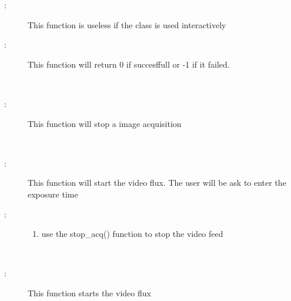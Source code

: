 \documentclass[letterpaper,10pt,english]{sphinxmanual}
\begin{document}
\begin{fulllineitems}
\begin{fulllineitems}
\begin{description}
\item[{:}] \leavevmode
This function is useless if the class is used interactively

\item[{:}] \leavevmode
This function will return 0 if succesffull or -1 if it failed.

\end{description}

\end{fulllineitems}


\begin{fulllineitems}
\label{\detokenize{index:python_andor.command.stop_acq}}~\begin{description}
\item[{:}] \leavevmode
This function will stop a image acquisition

\end{description}

\end{fulllineitems}


\begin{fulllineitems}
\label{\detokenize{index:python_andor.command.video}}~\begin{description}
\item[{:}] \leavevmode
This function will start the video flux. The user will be ask to enter the exposure time

\item[{:}] \leavevmode\begin{enumerate}
\item {} 
use the stop\_acq() function to stop the video feed

\end{enumerate}

\end{description}

\end{fulllineitems}


\begin{fulllineitems}
\label{\detokenize{index:python_andor.command.video_flux}}~\begin{description}
\item[{:}] \leavevmode
This function starts the video flux


\end{description}
\end{fulllineitems}
\end{fulllineitems}
\end{document}
